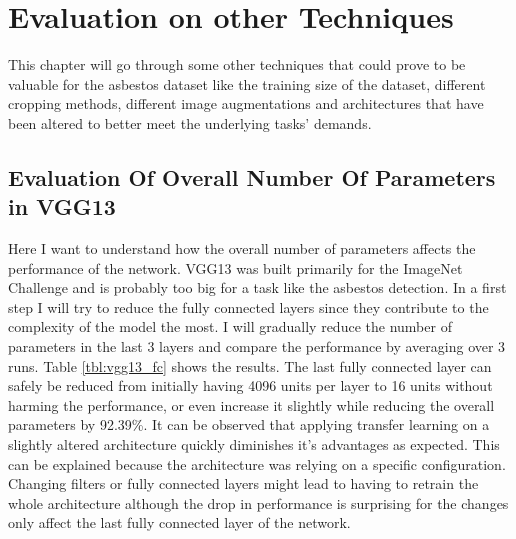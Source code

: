\chapter{Evaluation on other Techniques}

This chapter will go through some other techniques that could prove to be valuable for the asbestos dataset like the training size of the dataset, different cropping methods, different image augmentations and architectures that have been altered to better meet the underlying tasks' demands.

\section{Evaluation Of Overall Number Of Parameters in VGG13}

Here I want to understand how the overall number of parameters affects the performance of the network. VGG13 was built primarily for the ImageNet Challenge and is probably too big for a task like the asbestos detection. In a first step I will try to reduce the fully connected layers since they  contribute to the complexity of the model the most. I will gradually reduce the number of parameters in the last 3 layers and compare the performance by averaging over 3 runs. Table \ref{tbl:vgg13_fc} shows the results. The last fully connected layer can safely be reduced from initially having 4096 units per layer to 16 units without harming the performance, or even increase it slightly while reducing the overall parameters by 92.39\%. It can be observed that applying transfer learning on a slightly altered architecture quickly diminishes it's advantages as expected. This can be explained because the architecture was relying on a specific configuration. Changing filters or fully connected layers might lead to having to retrain the whole architecture although the drop in performance is surprising for the changes only affect the last fully connected layer of the network. \\


